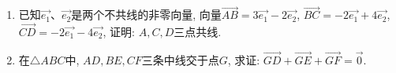 \documentclass[10pt,a4paper]{article}
\newcommand{\blank}[1]{\underline{\hbox to #1pt{}}}
\begin{document}
\begin{enumerate}[1.]
(2)对于实数$m,n$和向量$\overrightarrow a$, 恒有$(m-n)\overrightarrow a=m\overrightarrow a-n\overrightarrow a$.\blank{20}; \\
(3)若$m\overrightarrow a=m\overrightarrow b$($m\in \mathbf{R}$), 则$\overrightarrow a=\overrightarrow b$.\blank{20}; \\
(4)若$m\overrightarrow a=n\overrightarrow b(m,n\in \mathbf{R},\overrightarrow a\ne \overrightarrow 0)$, 则$\overrightarrow a=\overrightarrow b$.\blank{20}.
\item 已知$\overrightarrow{e_1}$、$\overrightarrow{e_2}$是两个不共线的非零向量, 向量$\overrightarrow{AB}=3\overrightarrow{e_1}-2\overrightarrow{e_2}$, $\overrightarrow{BC}=-2\overrightarrow{e_1}+4\overrightarrow{e_2}$, $\overrightarrow{CD}=-2\overrightarrow{e_1}-4\overrightarrow{e_2}$, 证明: $A,C,D$三点共线.
\item 在$\triangle ABC$中, $AD,BE,CF$三条中线交于点$G$, 求证: $\overrightarrow{GD}+\overrightarrow{GE}+\overrightarrow{GF}=\overrightarrow 0$.
    
\end{enumerate}
\end{document}
